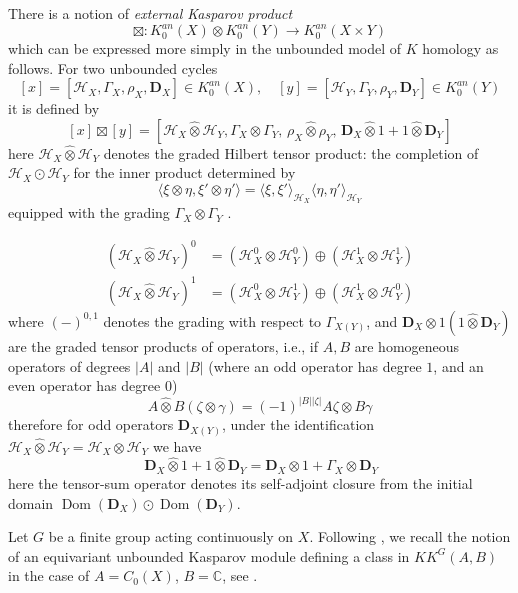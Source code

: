\documentclass[11pt,leqno,twoside]{amsart}
\theoremstyle{plainsl}
\theoremstyle{definition}
\newcommand{\C}{\mathbb{C}}
\newcommand{\bD}{\mathbf{D}}
\begin{document}
There is a notion of \textit{external Kasparov product}  \cite{K}
 \begin{equation}\label{external_kasparov_product}
     \boxtimes:K^{an}_0(X)\otimes K^{an}_0(Y)\rightarrow K^{an}_{0}(X\times Y)
 \end{equation}
which can be expressed more simply  in the unbounded model of $K$ homology as follows.  For two unbounded cycles 
\[[x]=[\mathcal{H}_X,\Gamma_X,\rho_X,\bD_X] \in K^{an}_0(X),\quad [y]=[\mathcal{H}_Y,\Gamma_Y,\rho_Y,\bD_Y] \in K^{an}_0(Y)\]
it is defined by
 \[[x]\boxtimes [y]=\left[
\mathcal{H}_X\widehat{\otimes} \mathcal{H}_Y,\Gamma_X\otimes \Gamma_Y,\,
\rho_X\widehat{\otimes}\rho_Y,\,
\bD_X\widehat{\otimes}1+1\widehat{\otimes}\bD_Y
\right]\]
here $\mathcal H_X\widehat\otimes\mathcal H_Y$ denotes
the graded Hilbert tensor product: the completion of
$\mathcal H_X\odot\mathcal H_Y$ for the inner product
determined by
\[
\langle \xi\otimes\eta,\xi'\otimes\eta'\rangle
=
\langle\xi,\xi'\rangle_{\mathcal H_X}
\langle\eta,\eta'\rangle_{\mathcal H_Y}
\]
equipped with the grading $\Gamma_X\otimes\Gamma_Y$
\cite[\S~14.4]{Bl}.


\[
\begin{aligned}
(\mathcal H_X\widehat{\otimes}\mathcal H_Y)^0
&=(\mathcal H_X^0\otimes\mathcal H_Y^0)
\oplus(\mathcal H_X^1\otimes\mathcal H_Y^1)\\
(\mathcal H_X\widehat{\otimes}\mathcal H_Y)^1
&=(\mathcal H_X^0\otimes\mathcal H_Y^1)
\oplus(\mathcal H_X^1\otimes\mathcal H_Y^0)
\end{aligned}
\]
where $(-)^{0,1}$ denotes the grading with respect to $\Gamma_{X(Y)}$,
and $\bD_X\widehat{\otimes}1 (1\widehat{\otimes}\bD_Y)$ are the graded tensor products of operators, i.e., if $A,B$ are homogeneous operators of degrees $|A|$ and $|B|$ (where an odd operator has degree \(1\), and an even operator has degree \(0\))
\[A\widehat{\otimes}B(\zeta\otimes \gamma)=(-1)^{|B||\zeta|} A\zeta\otimes B\gamma\]
therefore for odd operators $\bD_{X(Y)}$, under the identification $\mathcal H_X\widehat{\otimes}\mathcal H_Y=\mathcal H_X{\otimes}\mathcal H_Y$ we have
\[\,
\bD_X\widehat{\otimes}1+1\widehat{\otimes}\bD_Y={\bD_X\otimes 1 +\Gamma_X\otimes \bD_Y}\]
here the tensor-sum operator denotes its self-adjoint
closure from the initial domain
$\operatorname{Dom}(\bD_X)\odot
\operatorname{Dom}(\bD_Y)$.






Let $G$ be a finite group acting continuously on $X$.
Following \cite[Def.~2.1]{FR}, we recall
the notion of an equivariant unbounded Kasparov
module defining a class in  $KK^G(A,B)$ in the case of
$A=C_0(X)$, $B=\C$, see
\cite[Remark~2.2]{FR}.
\end{document}
